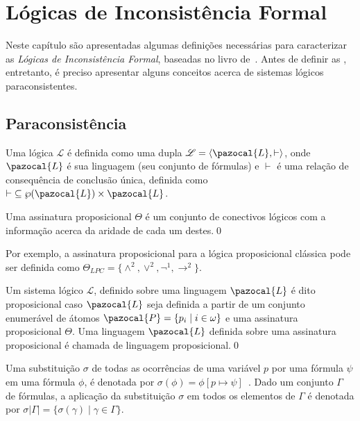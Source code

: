 \chapter{Lógicas de Inconsistência Formal}
\label{cap:LFIs}
Neste capítulo são apresentadas algumas definições necessárias para caracterizar as \textit{Lógicas de Inconsistência Formal}, baseadas no livro de~. Antes de definir as \lfis{}, entretanto, é preciso apresentar alguns conceitos acerca de sistemas lógicos paraconsistentes.

\section{Paraconsistência}
\label{sec:paracons}
Uma lógica $\mathcal{L}$ é definida como uma dupla $\mathcal{L} = \langle \pazocal{L},\vdash \rangle$, onde $\pazocal{L}$ é sua linguagem (seu conjunto de fórmulas) e $\vdash$ é uma relação de consequência de conclusão única, definida como $\vdash \;\subseteq \wp(\pazocal{L})\times\pazocal{L}$.

\begin{definicao}
    \label{def:ass_prop}
    Uma assinatura proposicional $\Theta$ é um conjunto de conectivos lógicos com a informação acerca da aridade de cada um destes.\qed{}
\end{definicao}
    Por exemplo, a assinatura proposicional para a lógica proposicional clássica pode ser definida como $\Theta_{LPC} = \{\land^{2}, \lor^{2}, \neg^{1}, \rightarrow^{2}\}$.

\begin{definicao}
    \label{def:proposicional}
    Um sistema lógico $\mathcal{L}$, definido sobre uma linguagem $\pazocal{L}$ é dito proposicional caso $\pazocal{L}$ seja definida a partir de um conjunto enumerável de átomos $\pazocal{P} = \{p_{i} \;| \; i \in \omega \}$ e uma assinatura proposicional $\Theta$. Uma linguagem $\pazocal{L}$ definida sobre uma assinatura proposicional é chamada de linguagem proposicional.\qed{}
\end{definicao}

\begin{notacao}[Substituição]
Uma substituição $\sigma$ de todas as ocorrências de uma variável $p$ por uma fórmula $\psi$ em uma fórmula $\phi$, é denotada por $\sigma(\phi) = \phi[p \mapsto \psi]$~\cite{dedo}. Dado um conjunto $\Gamma$ de fórmulas, a aplicação da substituição $\sigma$ em todos os elementos de $\Gamma$ é denotada por $\sigma|\Gamma| = \{\sigma(\gamma) \; | \; \gamma \in \Gamma\}$. 
\end{notacao}

